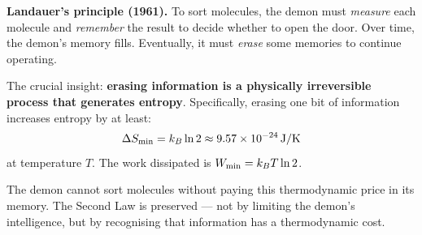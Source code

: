 \documentclass[12pt, a4paper, twoside]{book}
\begin{document}
\begin{discoverybox}
\textbf{Landauer's principle (1961).} To sort molecules, the demon must \textit{measure} each molecule and \textit{remember} the result to decide whether to open the door. Over time, the demon's memory fills. Eventually, it must \textit{erase} some memories to continue operating.

The crucial insight: \textbf{erasing information is a physically irreversible process that generates entropy}. Specifically, erasing one bit of information increases entropy by at least:
\begin{equation}
  \Delta S_{\rm min} = k_B \ln 2 \approx \SI{9.57e-24}{J/K}
\end{equation}
at temperature $T$. The work dissipated is $W_{\rm min} = k_BT\ln 2$.

The demon cannot sort molecules without paying this thermodynamic price in its memory. The Second Law is preserved --- not by limiting the demon's intelligence, but by recognising that information has a thermodynamic cost.
\end{discoverybox}
\end{document}
